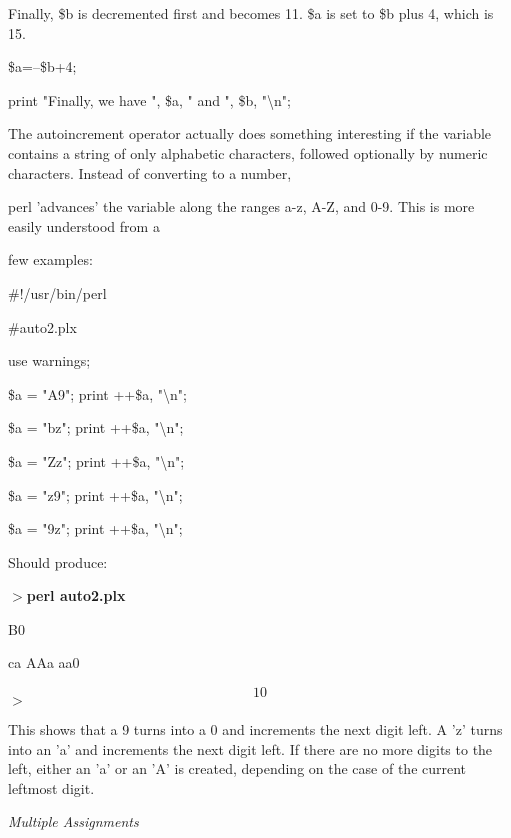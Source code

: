 \documentclass[a4paper,11pt]{book}
\begin{document}
\noindent 

\noindent 

\noindent Finally, \$b is decremented first and becomes 11. \$a is set to \$b plus 4, which is 15.

\noindent 

\noindent \$a=--\$b+4;

\noindent print "Finally, we have ", \$a, " and ", \$b, "\textbackslash n";

\noindent 

\noindent The autoincrement operator actually does something interesting if the variable contains a string of only alphabetic characters, followed optionally by numeric characters. Instead of converting to a number,

\noindent perl 'advances' the variable along the ranges a-z, A-Z, and 0-9. This is more easily understood from a

\noindent few examples:

\noindent 

\noindent \#!/usr/bin/perl

\noindent \#auto2.plx

\noindent use warnings;

\noindent \$a = "A9"; print ++\$a, "\textbackslash n";

\noindent \$a = "bz"; print ++\$a, "\textbackslash n";

\noindent \$a = "Zz"; print ++\$a, "\textbackslash n";

\noindent \$a = "z9"; print ++\$a, "\textbackslash n";

\noindent \$a = "9z"; print ++\$a, "\textbackslash n";

\noindent 

\noindent Should produce:

\noindent 

\noindent $>$\textbf{perl auto2.plx}

\noindent B0

\noindent ca AAa aa0

\[10\] 
$>$

\noindent 

\noindent This shows that a 9 turns into a 0 and increments the next digit left. A 'z' turns into an 'a' and increments the next digit left. If there are no more digits to the left, either an 'a' or an 'A' is created, depending on the case of the current leftmost digit.

\noindent 

\noindent \textit{Multiple Assignments}
\end{document}
